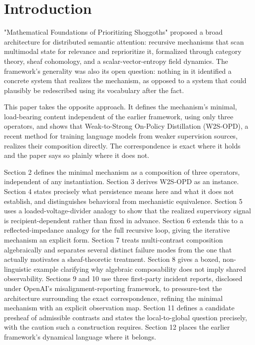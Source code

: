\documentclass[11pt]{article}
\begin{document}
\section{Introduction}

"Mathematical Foundations of Prioritizing Shoggoths" \cite{flyxion_shoggoths_2025} proposed a broad architecture for distributed semantic attention: recursive mechanisms that scan multimodal state for relevance and reprioritize it, formalized through category theory, sheaf cohomology, and a scalar-vector-entropy field dynamics. The framework's generality was also its open question: nothing in it identified a concrete system that realizes the mechanism, as opposed to a system that could plausibly be redescribed using its vocabulary after the fact.

This paper takes the opposite approach. It defines the mechanism's minimal, load-bearing content independent of the earlier framework, using only three operators, and shows that Weak-to-Strong On-Policy Distillation (W2S-OPD), a recent method for training language models from weaker supervision sources, realizes their composition directly. The correspondence is exact where it holds and the paper says so plainly where it does not.

Section 2 defines the minimal mechanism as a composition of three operators, independent of any instantiation. Section 3 derives W2S-OPD as an instance. Section 4 states precisely what persistence means here and what it does not establish, and distinguishes behavioral from mechanistic equivalence. Section 5 uses a loaded-voltage-divider analogy to show that the realized supervisory signal is recipient-dependent rather than fixed in advance. Section 6 extends this to a reflected-impedance analogy for the full recursive loop, giving the iterative mechanism an explicit form. Section 7 treats multi-contrast composition algebraically and separates several distinct failure modes from the one that actually motivates a sheaf-theoretic treatment. Section 8 gives a boxed, non-linguistic example clarifying why algebraic composability does not imply shared observability. Sections 9 and 10 use three first-party incident reports, disclosed under OpenAI's misalignment-reporting framework, to pressure-test the architecture surrounding the exact correspondence, refining the minimal mechanism with an explicit observation map. Section 11 defines a candidate presheaf of admissible contrasts and states the local-to-global question precisely, with the caution such a construction requires. Section 12 places the earlier framework's dynamical language where it belongs.
\end{document}

